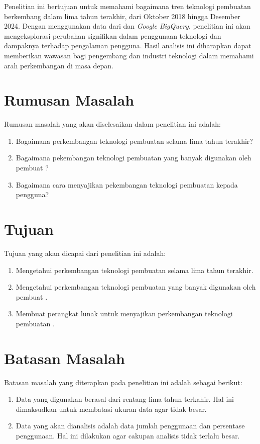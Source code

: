 Penelitian ini bertujuan untuk memahami bagaimana tren teknologi pembuatan \web berkembang dalam lima tahun terakhir, dari Oktober 2018 hingga Desember 2024. Dengan menggunakan data dari \http dan \textit{Google BigQuery}, penelitian ini akan mengeksplorasi perubahan signifikan dalam penggunaan teknologi \web dan dampaknya terhadap pengalaman pengguna. Hasil analisis ini diharapkan dapat memberikan wawasan bagi pengembang \web dan industri teknologi dalam memahami arah perkembangan \web di masa depan.
    
\section{Rumusan Masalah}
	Rumusan masalah yang akan diselesaikan dalam penelitian ini adalah:
    \begin{enumerate}
        \item Bagaimana perkembangan teknologi pembuatan \web selama lima tahun terakhir?
        \item Bagaimana pekembangan teknologi pembuatan \web yang banyak digunakan oleh pembuat \web?
        \item Bagaimana cara menyajikan pekembangan teknologi pembuatan \web kepada pengguna?
    \end{enumerate}
	
\section{Tujuan}
	Tujuan yang akan dicapai dari penelitian ini adalah:
    \begin{enumerate}
        \item Mengetahui perkembangan teknologi pembuatan \web selama lima tahun terakhir.
        \item Mengetahui perkembangan teknologi pembuatan \web yang banyak digunakan oleh pembuat \web.
        \item Membuat perangkat lunak untuk menyajikan perkembangan teknologi pembuatan \web.
    \end{enumerate}
    
\section{Batasan Masalah}
\label{sec:batasan}
Batasan masalah yang diterapkan pada penelitian ini adalah sebagai berikut:
\begin{enumerate}
    \item Data yang digunakan berasal dari rentang lima tahun terkahir. Hal ini dimaksudkan untuk membatasi ukuran data agar tidak besar.
    \item Data yang akan dianalisis adalah data jumlah penggunaan dan persentase penggunaan. Hal ini dilakukan agar cakupan analisis tidak terlalu besar.
\end{enumerate}

